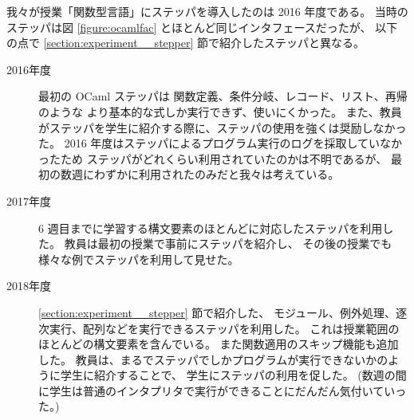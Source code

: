 我々が授業「関数型言語」にステッパを導入したのは 2016 年度である。
当時のステッパは図 \ref{figure:ocamlfac} とほとんど同じインタフェースだったが、
以下の点で \ref{section:experiment__stepper} 節で紹介したステッパと異なる。
\begin{description}
\item[2016年度] 最初の OCaml ステッパは
関数定義、条件分岐、レコード、リスト、再帰のような
より基本的な式しか実行できず、使いにくかった。
また、教員がステッパを学生に紹介する際に、ステッパの使用を強くは奨励しなかった。
2016 年度はステッパによるプログラム実行のログを採取していなかったため
ステッパがどれくらい利用されていたのかは不明であるが、
最初の数週にわずかに利用されたのみだと我々は考えている。
\item[2017年度] 6 週目までに学習する構文要素のほとんどに対応したステッパを利用した。
教員は最初の授業で事前にステッパを紹介し、
その後の授業でも様々な例でステッパを利用して見せた。
\item[2018年度] \ref{section:experiment__stepper} 節で紹介した、
モジュール、例外処理、逐次実行、配列などを実行できるステッパを利用した。
これは授業範囲のほとんどの構文要素を含んでいる。
また関数適用のスキップ機能も追加した。
教員は、まるでステッパでしかプログラムが実行できないかのように学生に紹介することで、
学生にステッパの利用を促した。
(数週の間に学生は普通のインタプリタで実行ができることにだんだん気付いていった。)
\end{description}

